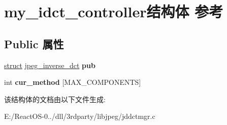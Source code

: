 \hypertarget{structmy__idct__controller}{}\section{my\+\_\+idct\+\_\+controller结构体 参考}
\label{structmy__idct__controller}
\subsection*{Public 属性}
\begin{DoxyCompactItemize}
\item 
\mbox{\label{structmy__idct__controller_ace0aef71b868fc10da51a4be6f8b56ca}} 
\hyperlink{interfacestruct}{struct} \hyperlink{structjpeg__inverse__dct}{jpeg\+\_\+inverse\+\_\+dct} {\bfseries pub}
\item 
\mbox{\label{structmy__idct__controller_ac13e3955a30c7b2a75c835dc803182cb}} 
int {\bfseries cur\+\_\+method} \mbox{[}M\+A\+X\+\_\+\+C\+O\+M\+P\+O\+N\+E\+N\+TS\mbox{]}
\end{DoxyCompactItemize}


该结构体的文档由以下文件生成\+:\begin{DoxyCompactItemize}
\item 
E\+:/\+React\+O\+S-\/0../dll/3rdparty/libjpeg/jddctmgr.\+c\end{DoxyCompactItemize}
